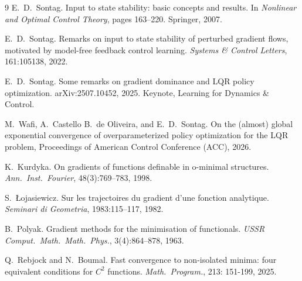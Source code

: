 \documentclass[11pt]{article}
\theoremstyle{plain}
\theoremstyle{definition}
\theoremstyle{remark}
\begin{document}
\begin{thebibliography}{9}
E.~D.~Sontag.
\newblock Input to state stability: basic concepts and results.
\newblock In \emph{Nonlinear and Optimal Control Theory}, pages 163--220.
Springer, 2007.

E.~D.~Sontag.
\newblock Remarks on input to state stability of perturbed gradient flows,
motivated by model-free feedback control learning.
\newblock \emph{Systems \& Control Letters}, 161:105138, 2022.

E.~D.~Sontag.
\newblock Some remarks on gradient dominance and LQR policy optimization.
\newblock arXiv:2507.10452, 2025. Keynote, Learning for Dynamics \& Control.

M.~Wafi, A.~Castello B.~de Oliveira, and E.~D.~Sontag.
\newblock On the (almost) global exponential convergence of overparameterized
policy optimization for the LQR problem, Proceedings of American Control
Conference (ACC), 2026.

K.~Kurdyka.
\newblock On gradients of functions definable in o-minimal structures.
\newblock \emph{Ann.\ Inst.\ Fourier}, 48(3):769--783, 1998.

S.~\L{}ojasiewicz.
\newblock Sur les trajectoires du gradient d'une fonction analytique.
\newblock \emph{Seminari di Geometria}, 1983:115--117, 1982.

B.~Polyak.
\newblock Gradient methods for the minimisation of functionals.
\newblock \emph{USSR Comput.\ Math.\ Math.\ Phys.}, 3(4):864--878, 1963.

Q.~Rebjock and N.~Boumal.
\newblock Fast convergence to non-isolated minima: four equivalent conditions
for $C^2$ functions.
\newblock \emph{Math.\ Program.}, 213: 151-199, 2025.

\end{thebibliography}
\end{document}
